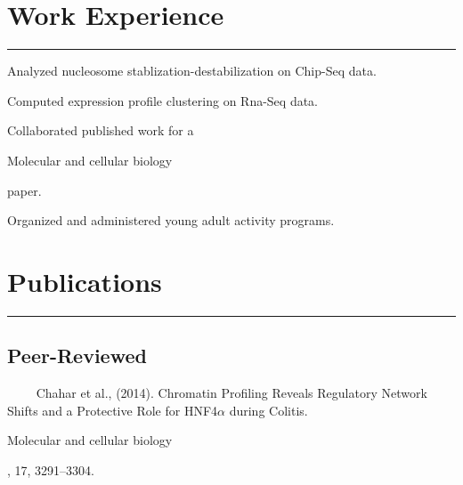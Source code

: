 \documentclass[letterpaper]{deedy-resume} %
\newcommand{\colorrule}[1]{%
\begingroup\color{#1}\hrule\endgroup%
}%
\begin{document}
\section{Work Experience}
\normalfont
\colorrule{black}
\vspace{2 mm}
\hfill
{}
\hfill
{}
\vspace{1 mm}
\begin{tightitemize}
	\item Analyzed nucleosome stablization-destabilization  on Chip-Seq data. 
	\item Computed expression profile clustering on Rna-Seq data. 	
	\item Collaborated published work for a \begin{em}Molecular and cellular biology\end{em} paper.
\end{tightitemize}
\sectionspace %
\vspace{2 mm}
\hfill
{}
\hfill
{}
\vspace{1 mm}
\begin{tightitemize}
	\item Organized and administered young adult activity programs.
\end{tightitemize}
\sectionspace

\section{Publications}
\normalfont
\colorrule{black}
\vspace{2 mm}
\subsection{Peer-Reviewed}
\quad \ \ \textbullet{} \ \ Chahar et al., (2014). Chromatin Profiling Reveals Regulatory Network Shifts and a Protective Role for HNF4$\alpha$ during Colitis. \begin{em}Molecular and cellular biology\end{em}, 17, 3291–3304.
%
%
\end{document}
